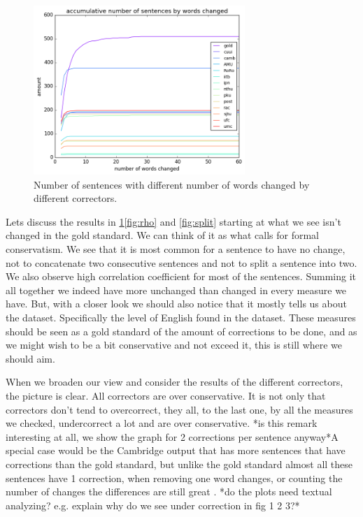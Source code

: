 \documentclass[english]{article}
\begin{document}
{\begin{figure}
	\includegraphics[width = 8cm]{words_differences}
	\caption{Number of sentences with different number of words changed by different correctors.}
	\label{fig:words_changed}
\end{figure}

Lets discuss the results in \ref{fig:words_changed}\ref{fig:rho} and \ref{fig:split} starting at what we see isn't changed in the gold standard. We can think of it as what calls for formal conservatism. We see that it is most common for a sentence to have
no change, not to concatenate two consecutive sentences and not to
split a sentence into two. We also observe high correlation coefficient
for most of the sentences. Summing it all together we indeed have
more unchanged than changed in every measure we have. But, with a
closer look we should also notice that it mostly tells us about the
dataset. Specifically the level of English found in the dataset.
These measures should be seen as a gold standard of the amount of
corrections to be done, and as we might wish to be a bit conservative
and not exceed it, this is still where we should aim.

When we broaden our view and consider the results of the different
correctors, the picture is clear. All correctors are over conservative.
It is not only that correctors don't tend to overcorrect, they all,
to the last one, by all the measures we checked, undercorrect a lot
and are over conservative. {*}is this remark interesting at all, we show the graph for 2 corrections per sentence anyway{*}A special case would be the Cambridge output that has more sentences that have corrections than the gold standard, but unlike the gold standard almost all these sentences have 1 correction, when removing one word changes, or counting the number of changes the differences are still great . {*}do the plots need textual analyzing? e.g. explain why do we see under correction in fig 1 2 3?{*}


}
\end{document}
